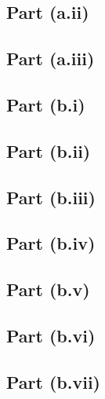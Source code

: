 \subsection{Part (a.ii)}\label{sec:q-1-a-ii}
\subsection{Part (a.iii)}\label{sec:q-1-a-iii}
\subsection{Part (b.i)}\label{sec:q-1-b-i}
\subsection{Part (b.ii)}\label{sec:q-1-b-ii}
\subsection{Part (b.iii)}\label{sec:q-1-b-iii}
\subsection{Part (b.iv)}\label{sec:q-1-b-iv}
\subsection{Part (b.v)}\label{sec:q-1-b-v}
\subsection{Part (b.vi)}\label{sec:q-1-b-vi}
\subsection{Part (b.vii)}\label{sec:q-1-b-vii}

